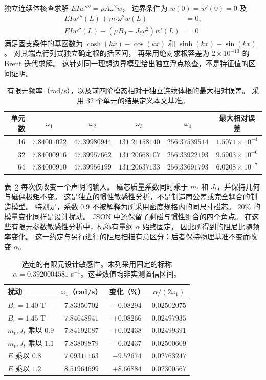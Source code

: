 独立连续体核查求解 $EIw''''=\rho A\omega^2w$，
边界条件为 $w(0)=w'(0)=0$ 及
\begin{equation}
 \begin{split}
 EIw'''(L)+m_t\omega^2w(L)&=0,\\
 EIw''(L)+(\mu B_0-J_t\omega^2)w'(L)&=0.
 \end{split}
 \label{sx:boundary-check}
\end{equation}
满足固支条件的基函数为 $\cosh(kx)-\cos(kx)$ 和 $\sinh(kx)-\sin(kx)$。
对其端点行列式独立确定根的括区间，
再采用绝对求根容差为 $2\times10^{-13}$ 的 Brent 迭代求解。
这针对同一理想边界模型给出独立浮点核查，不是特征值的区间证明。

\begin{table}[t]
\centering
\caption{有限元频率（rad/s），以及前四阶模态相对于独立连续体根的最大相对误差。
采用 $32$ 个单元的结果定义本文基准。}
\label{sx:fe-table}
\setlength{\tabcolsep}{5pt}
\begin{tabular}{rccccc}
\toprule
单元数 & $\omega_1$ & $\omega_2$ & $\omega_3$ & $\omega_4$ & 最大相对误差\\
\midrule
16 & $7.84001022$ & $47.39980944$ & $131.21158140$ & $256.37539514$ & $1.5071\times10^{-4}$ \\
32 & $7.84000916$ & $47.39957662$ & $131.20668107$ & $256.33922193$ & $9.5903\times10^{-6}$ \\
64 & $7.84000910$ & $47.39956199$ & $131.20637133$ & $256.33691793$ & $6.0208\times10^{-7}$ \\
\bottomrule
\end{tabular}
\end{table}

表~\ref{sx:sensitivity-table} 每次仅改变一个声明的输入。
磁芯质量系数同时乘于 $m_t$ 和 $J_t$，并保持几何与磁偶极矩不变。
这是独立的惯性敏感性分析，不是制造商公差或完全耦合的制造模型。
特别是，系数 $0.9$ 不被解释为所采用密度规格内的同尺寸磁芯。
$20\%$ 的模量变化同样是设计扰动。
JSON 中还保留了剩磁与惯性组合的四个角点。
在这些有限元参数敏感性分析中，标称有量纲 $\alpha$ 始终固定，
因此所得到的阻尼比随频率变化。
这一约定与另行进行的阻尼扫描有意区分：后者保持物理基准不变而改变 $\alpha$。

\begin{table}[t]
\centering
\caption{选定的有限元设计敏感性。末列采用固定的标称
$\alpha=0.3920004581$ s$^{-1}$。这些数值均非实测置信区间。}
\label{sx:sensitivity-table}
\begin{tabular}{lccc}
\toprule
扰动 & $\omega_1$（rad/s） & 变化（\%） & $\alpha/(2\omega_1)$\\
\midrule
$B_r=1.40$ T & $7.83350702$ & $-0.08294$ & $0.02502075$ \\
$B_r=1.45$ T & $7.84648941$ & $+0.08266$ & $0.02497935$ \\
$m_t,J_t$ 乘以 $0.9$ & $7.84192087$ & $+0.02438$ & $0.02499391$ \\
$m_t,J_t$ 乘以 $1.1$ & $7.83809879$ & $-0.02437$ & $0.02500609$ \\
$E$ 乘以 $0.8$ & $7.09311163$ & $-9.52674$ & $0.02763247$ \\
$E$ 乘以 $1.2$ & $8.51964699$ & $+8.66884$ & $0.02300567$ \\
\bottomrule
\end{tabular}
\end{table}

